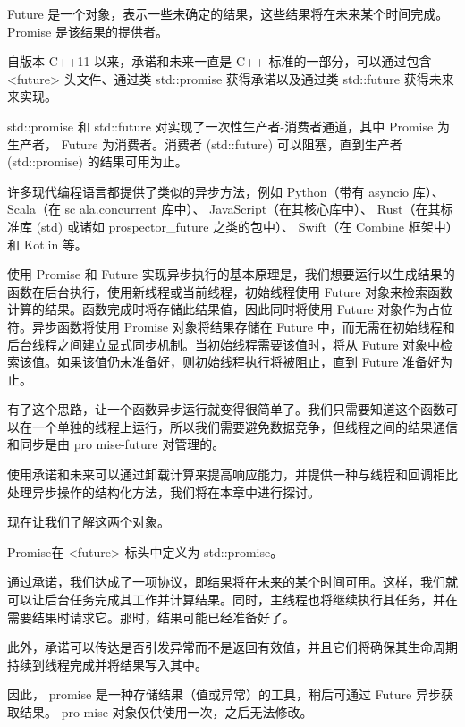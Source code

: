 
Future 是一个对象，表示一些未确定的结果，这些结果将在未来某个时间完成。 Promise 是该结果的提供者。

自版本 C++11 以来，承诺和未来一直是 C++ 标准的一部分，可以通过包含 <future> 头文件、通过类 std::promise 获得承诺以及通过类 std::future 获得未来来实现。

std::promise 和 std::future 对实现了一次性生产者-消费者通道，其中 Promise 为生产者， Future 为消费者。消费者 (std::future) 可以阻塞，直到生产者 (std::promise) 的结果可用为止。


许多现代编程语言都提供了类似的异步方法，例如 Python（带有 asyncio 库）、 Scala（在 sc ala.concurrent 库中）、 JavaScript（在其核心库中）、 Rust（在其标准库 (std) 或诸如 prospector\_future 之类的包中）、 Swift（在 Combine 框架中）和 Kotlin 等。

使用 Promise 和 Future 实现异步执行的基本原理是，我们想要运行以生成结果的函数在后台执行，使用新线程或当前线程，初始线程使用 Future 对象来检索函数计算的结果。函数完成时将存储此结果值，因此同时将使用 Future 对象作为占位符。异步函数将使用 Promise 对象将结果存储在 Future 中，而无需在初始线程和后台线程之间建立显式同步机制。当初始线程需要该值时，将从 Future 对象中检索该值。如果该值仍未准备好，则初始线程执行将被阻止，直到 Future 准备好为止。

有了这个思路，让一个函数异步运行就变得很简单了。我们只需要知道这个函数可以在一个单独的线程上运行，所以我们需要避免数据竞争，但线程之间的结果通信和同步是由 pro mise-future 对管理的。

使用承诺和未来可以通过卸载计算来提高响应能力，并提供一种与线程和回调相比处理异步操作的结构化方法，我们将在本章中进行探讨。

现在让我们了解这两个对象。


Promise在 <future> 标头中定义为 std::promise。

通过承诺，我们达成了一项协议，即结果将在未来的某个时间可用。这样，我们就可以让后台任务完成其工作并计算结果。同时，主线程也将继续执行其任务，并在需要结果时请求它。那时，结果可能已经准备好了。

此外，承诺可以传达是否引发异常而不是返回有效值，并且它们将确保其生命周期持续到线程完成并将结果写入其中。

因此， promise 是一种存储结果（值或异常）的工具，稍后可通过 Future 异步获取结果。 pro mise 对象仅供使用一次，之后无法修改。

